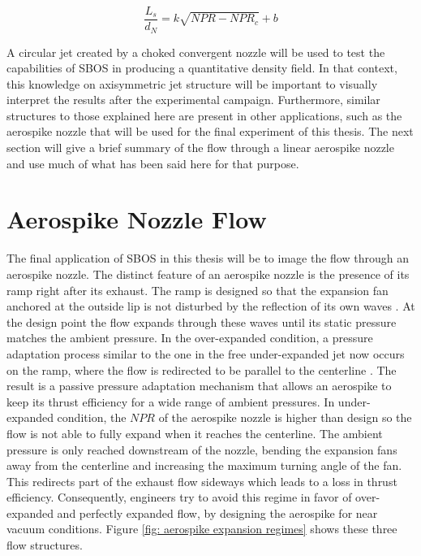 \begin{equation}
    \label{equation: Lazarus-Hartmann Formula}
    \frac{L_s}{d_N} = k\sqrt{NPR - NPR_c}+b
\end{equation}

\par A circular jet created by a choked convergent nozzle will be used to test the capabilities of SBOS in producing a quantitative density field. In that context, this knowledge on axisymmetric jet structure will be important to visually interpret the results after the experimental campaign. Furthermore, similar structures to those explained here are present in other applications, such as the aerospike nozzle that will be used for the final experiment of this thesis. The next section will give a brief summary of the flow through a linear aerospike nozzle and use much of what has been said here for that purpose.

\section{Aerospike Nozzle Flow}
\label{section: aerospike nozzle theory}
\par The final application of SBOS in this thesis will be to image the flow through an aerospike nozzle. The distinct feature of an aerospike nozzle is the presence of its ramp right after its exhaust. The ramp is designed so that the expansion fan anchored at the outside lip is not disturbed by the reflection of its own waves \cite{Wisse2005}. At the design point the flow expands through these waves until its static pressure matches the ambient pressure. In the over-expanded condition, a pressure adaptation process similar to the one in the free under-expanded jet now occurs on the ramp, where the flow is redirected to be parallel to the centerline \cite{Hagemann1998}. The result is a passive pressure adaptation mechanism that allows an aerospike to keep its thrust efficiency for a wide range of ambient pressures. In under-expanded condition, the $NPR$ of the aerospike nozzle is higher than design so the flow is not able to fully expand when it reaches the centerline. The ambient pressure is only reached downstream of the nozzle, bending the expansion fans away from the centerline and increasing the maximum turning angle of the fan. This redirects part of the exhaust flow sideways which leads to a loss in thrust efficiency. Consequently, engineers try to avoid this regime in favor of over-expanded and perfectly expanded flow, by designing the aerospike for near vacuum conditions. Figure \ref{fig: aerospike expansion regimes} shows these three flow structures.

